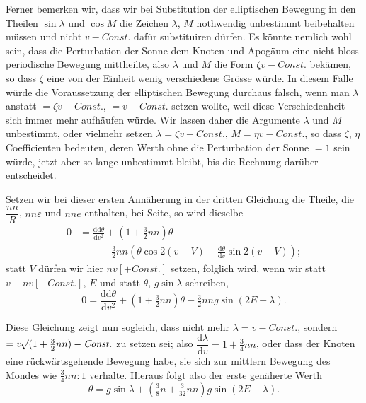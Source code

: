 \par\noindent\hspace*{\parindent}Ferner bemerken wir, dass wir bei Substitution der elliptischen Bewegung
in den Theilen \(\sin\lambda\) und \(\cos M\) die Zeichen \(\lambda\), \(M\)
nothwendig unbestimmt beibehalten müssen und nicht \(v-\mathit{Const.}\)
dafür substituiren dürfen. Es könnte nemlich wohl sein, dass die Perturbation
der Sonne dem Knoten und Apogäum eine nicht bloss periodische Bewegung mittheilte,
also \(\lambda\) und \(M\) die Form \(\zeta v-\mathit{Const.}\) bekämen,
so dass \(\zeta\) eine von der Einheit wenig verschiedene Grösse würde.
In diesem Falle würde die Voraussetzung der elliptischen Bewegung durchaus falsch,
wenn man \(\lambda\) anstatt \(=\zeta v-\mathit{Const.}\), \(=v-\mathit{Const.}\)
setzen wollte, weil diese Verschiedenheit sich immer mehr aufhäufen würde.
Wir lassen daher die Argumente \(\lambda\) und \(M\) unbestimmt, oder vielmehr
setzen \(\lambda=\zeta v-\mathit{Const.}\), \(M=\eta v-\mathit{Const.}\),
so dass \(\zeta\), \(\eta\) Coefficienten bedeuten, deren Werth ohne die Perturbation
der Sonne \(=1\) sein würde, jetzt aber so lange unbestimmt bleibt,
bis die Rechnung darüber entscheidet.

\par\noindent\hspace*{\parindent}Setzen wir bei dieser ersten Annäherung in der dritten Gleichung die
Theile, die \(\dfrac{nn}{R}\), \(nn\varepsilon\) und \(nne\) enthalten,
bei Seite, so wird dieselbe
\[
\begin{aligned}
0&=\frac{\mathrm{dd}\theta}{\mathrm{d}v^2}+(1+\tfrac32nn)\theta\\
&\qquad+\tfrac32nn\left(\theta\cos2(v-V)
-\frac{\mathrm{d}\theta}{\mathrm{d}v}\sin2(v-V)\right);
\end{aligned}
\]
\noindent statt \(V\) dürfen wir hier \(nv[+\mathit{Const.}]\) setzen,
folglich wird, wenn wir statt \(v-nv[-\mathit{Const.}]\), \(E\) und statt
\(\theta\), \(g\sin\lambda\) schreiben,
\[
0=\frac{\mathrm{dd}\theta}{\mathrm{d}v^2}+(1+\tfrac32nn)\theta
-\tfrac32nng\sin(2E-\lambda).
\]

\par\noindent\hspace*{\parindent}Diese Gleichung zeigt nun sogleich, dass nicht mehr
\(\lambda=v-\mathit{Const.}\), sondern
\(=v\mathord{{}^{}\!\surd}(1+\tfrac32nn)-\mathit{Const.}\) zu setzen sei;
also \(\dfrac{\mathrm{d}\lambda}{\mathrm{d}v}=1+\tfrac34nn\), oder dass der
Knoten eine rückwärtsgehende Bewegung habe, sie sich zur mittlern Bewegung
des Mondes wie \(\tfrac34nn:1\) verhalte. Hieraus folgt also der erste genäherte
Werth
\[
\theta=g\sin\lambda+(\tfrac38n+\tfrac{3}{32}nn)g\sin(2E-\lambda).
\]

